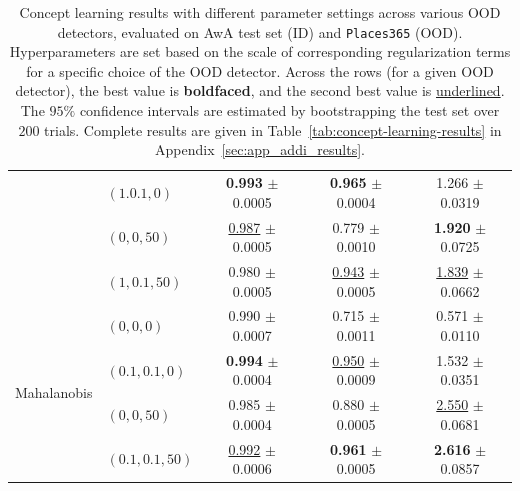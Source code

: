 \begin{table}[thb]
\begin{adjustbox}{width=1\columnwidth,center}
\begin{tabular}{l|l|c|c|c}
			& $(1. 0.1, 0)$ & \textbf{0.993} $\pm$ 0.0005 & \textbf{0.965} $\pm$ 0.0004 & 1.266 $\pm$ 0.0319 \\
			& $(0, 0, 50)$ & \underline{0.987} $\pm$ 0.0005 & 0.779 $\pm$ 0.0010 & \textbf{1.920} $\pm$ 0.0725 \\
			& $(1, 0.1, 50)$ & 0.980 $\pm$ 0.0005 & \underline{0.943} $\pm$ 0.0005 & \underline{1.839} $\pm$ 0.0662 \\ \hline
			\multirow{4}{0.10\linewidth}{Mahalanobis} 
			& $(0, 0, 0)$ & 0.990 $\pm$ 0.0007 & 0.715 $\pm$ 0.0011 & 0.571 $\pm$ 0.0110 \\
			& $(0.1, 0.1, 0)$ & \textbf{0.994} $\pm$ 0.0004 & \underline{0.950} $\pm$ 0.0009 & 1.532 $\pm$ 0.0351 \\
			& $(0, 0, 50)$ & 0.985 $\pm$ 0.0004 & 0.880 $\pm$ 0.0005 & \underline{2.550} $\pm$ 0.0681 \\
			& $(0.1, 0.1, 50)$ & \underline{0.992} $\pm$ 0.0006 & \textbf{0.961} $\pm$ 0.0005 & \textbf{2.616} $\pm$ 0.0857 \\ \bottomrule
		\end{tabular}
	\end{adjustbox}
	\caption[]{
	\small Concept learning results with different parameter settings across various OOD detectors, evaluated on AwA test set (ID) and \texttt{Places365} (OOD). 
Hyperparameters are set based on the scale of corresponding regularization terms for a specific choice of the OOD detector.
 Across the rows (for a given OOD detector), the best value is \textbf{boldfaced}, and the second best value is \underline{underlined}.
	The $95\%$ confidence intervals are estimated by bootstrapping the test set over $200$ trials. Complete results are given in Table~\ref{tab:concept-learning-results} in Appendix~\ref{sec:app_addi_results}.
	}
\label{tab:concept-learning-results-places}
\end{table}
%


